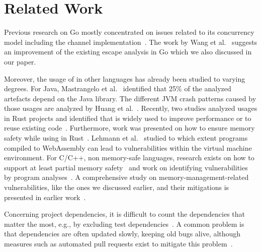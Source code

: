 \section{Related Work}
\label{sec:rw}

Previous research on Go mostly concentrated on issues related to its concurrency model including the channel implementation~\cite{tu2019,dilley2019,giunti2020,gabet2020,lange2017,bodden2016information}.
The work by Wang et al.~\cite{wang2020} suggests an improvement of the existing escape analysis in Go which we also discussed in our paper. 


Moreover, the usage of \unsafe{} in other languages has already been studied to varying degrees. 
For Java, Mastrangelo et al.~\cite{mastrangelo2015} identified that 25\% of the analyzed artefacts depend on the Java \unsafe{} library.
The different JVM crash patterns caused by those usages are analyzed by Huang et al.~\cite{huang2019}.
Recently, two studies analyzed \unsafe{} usages in Rust projects and identified that \unsafe{} is widely used to improve performance or to reuse existing code~\cite{qin2020,evans2020}.
Furthermore, work was presented on how to ensure memory safety while using \unsafe{} in Rust~\cite{hussain2018Fidelius}.
Lehmann et al.~\cite{lehmann-everything-2020} studied to which extent \unsafe{} programs compiled to WebAssembly can lead to vulnerabilities within the virtual machine environment. %
%
%
For C/C++, non memory-safe languages, research exists on how to support at least partial memory safety~\cite{burow2018CUP, nagarkatte2009SoftBound} and work on identifying vulnerabilities by program analyses~\cite{song2019sok}.
A comprehensive study on memory-management-related vulnerabilities, like the ones we discussed earlier, and their mitigations is presented in earlier work~\cite{szekeres2013sok}.

Concerning project dependencies, it is difficult to count the dependencies that matter the most, e.g., by excluding test dependencies~\cite{pashchenko2018}.
A common problem is that dependencies are often updated slowly, keeping old bugs alive, although measures such as automated pull requests exist to mitigate this problem~\cite{derr2017keep, mirhosseini2017, lauinger2017}.


